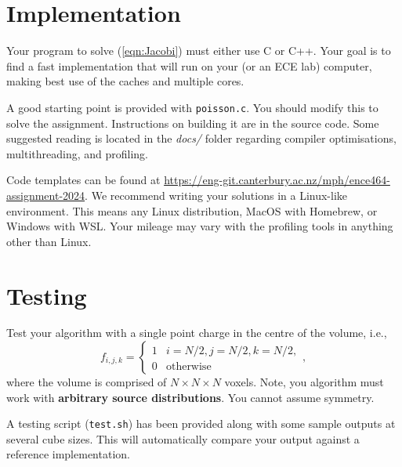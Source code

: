 \documentclass[a4paper,11pt]{article}
\newcommand{\code}[1]{\texttt{#1}}
\begin{document}
\section{Implementation}

Your program to solve (\ref{eqn:Jacobi}) must either use C or C++.
Your goal is to find a fast implementation that will run on your (or
an ECE lab) computer, making best use of the caches and multiple
cores.

A good starting point is provided with \code{poisson.c}. You should
modify this to solve the assignment.  Instructions on building it are
in the source code.  Some suggested reading is located in the
\emph{docs/} folder regarding compiler optimisations, multithreading,
and profiling.



Code templates can be found at
\url{https://eng-git.canterbury.ac.nz/mph/ence464-assignment-2024}. We
recommend writing your solutions in a Linux-like environment. This
means any Linux distribution, MacOS with Homebrew, or Windows with
WSL. Your mileage may vary with the profiling tools in anything other
than Linux.


\section{Testing}

Test your algorithm with a single point charge in the centre of the
volume, i.e.,
%
\begin{equation}
  f_{i,j,k} = \left\{
  \begin{array}{ll}
    1 & i=N/2, j=N/2, k=N/2, \\
    0 & \mbox{otherwise}
  \end{array}\right.,
\end{equation}
%
where the volume is comprised of $N \times N \times N$ voxels.  Note,
you algorithm must work with \textbf{arbitrary source distributions}.
You cannot assume symmetry.

A testing script (\code{test.sh}) has been provided along with some sample
outputs at several cube sizes. This will automatically compare your output
against a reference implementation.


\end{document}
